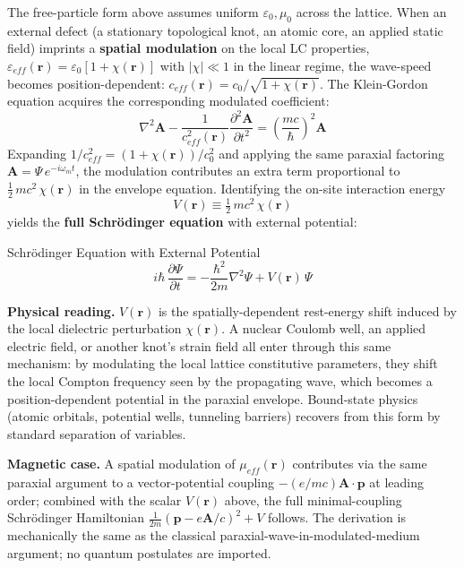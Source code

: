 The free-particle form above assumes uniform $\varepsilon_0, \mu_0$ across the lattice. When an external defect (a stationary topological knot, an atomic core, an applied static field) imprints a \textbf{spatial modulation} on the local LC properties, $\varepsilon_{eff}(\mathbf{r}) = \varepsilon_0 [1 + \chi(\mathbf{r})]$ with $|\chi| \ll 1$ in the linear regime, the wave-speed becomes position-dependent: $c_{eff}(\mathbf{r}) = c_0 / \sqrt{1 + \chi(\mathbf{r})}$. The Klein-Gordon equation acquires the corresponding modulated coefficient:
\begin{equation}
    \nabla^2 \mathbf{A} - \frac{1}{c_{eff}^2(\mathbf{r})}\frac{\partial^2 \mathbf{A}}{\partial t^2} = \left(\frac{mc}{\hbar}\right)^2 \mathbf{A}
\end{equation}
Expanding $1/c_{eff}^2 = (1+\chi(\mathbf{r}))/c_0^2$ and applying the same paraxial factoring $\mathbf{A} = \Psi\,e^{-i\omega_m t}$, the modulation contributes an extra term proportional to $\tfrac{1}{2}\,m c^2\,\chi(\mathbf{r})$ in the envelope equation. Identifying the on-site interaction energy
\begin{equation}
    V(\mathbf{r}) \equiv \tfrac{1}{2}\, m c^2\, \chi(\mathbf{r})
\end{equation}
yields the \textbf{full Schr\"odinger equation} with external potential:
\begin{resultbox}{Schr\"odinger Equation with External Potential}
\begin{equation}
    i\hbar\,\frac{\partial \Psi}{\partial t} = -\frac{\hbar^2}{2m}\nabla^2\Psi + V(\mathbf{r})\,\Psi
\end{equation}
\end{resultbox}
\textbf{Physical reading.} $V(\mathbf{r})$ is the spatially-dependent rest-energy shift induced by the local dielectric perturbation $\chi(\mathbf{r})$. A nuclear Coulomb well, an applied electric field, or another knot's strain field all enter through this same mechanism: by modulating the local lattice constitutive parameters, they shift the local Compton frequency seen by the propagating wave, which becomes a position-dependent potential in the paraxial envelope. Bound-state physics (atomic orbitals, potential wells, tunneling barriers) recovers from this form by standard separation of variables.

\textbf{Magnetic case.} A spatial modulation of $\mu_{eff}(\mathbf{r})$ contributes via the same paraxial argument to a vector-potential coupling $-(e/m c)\mathbf{A}\cdot\mathbf{p}$ at leading order; combined with the scalar $V(\mathbf{r})$ above, the full minimal-coupling Schr\"odinger Hamiltonian $\frac{1}{2m}(\mathbf{p} - e\mathbf{A}/c)^2 + V$ follows. The derivation is mechanically the same as the classical paraxial-wave-in-modulated-medium argument; no quantum postulates are imported.

